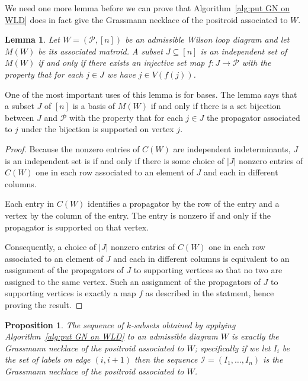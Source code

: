 \documentclass[11pt]{article}
\newcommand{\cP}{\mathcal{P}}
\newcommand{\II}{\mathcal{I}}
\newtheorem{lem}[thm]{Lemma}
\newtheorem{prop}[thm]{Proposition}
\theoremstyle{remark}
\theoremstyle{definition}
\begin{document}
We need one more lemma before we can prove that Algorithm~\ref{alg:put GN on WLD} does in fact give the Grassmann necklace of the positroid associated to $W$.

\begin{lem}\label{lem basis as perm}
Let $W = (\cP,[n])$ be an admissible Wilson loop diagram and let $M(W)$ be its associated matroid. A subset $J \subseteq [n]$ is an independent set of $M(W)$ if and only if there exists an injective set map $f : J \rightarrow \cP$ with the property that for each $j\in J$ we have $j \in V(f(j))$.
\end{lem}

One of the most important uses of this lemma is for bases.  The lemma says that a subset $J$ of $[n]$ is a basis of $M(W)$ if and only if there is a set bijection between $J$ and $\cP$ with the property that for each $j\in J$ the propagator associated to $j$ under the bijection is supported on vertex $j$.

\begin{proof}
  Because the nonzero entries of $C(W)$ are independent indeterminants,
  $J$ is an independent set is if and only if there is some choice of $|J|$ nonzero entries of $C(W)$ one in each row associated to an element of $J$ and each in different columns.

  Each entry in $C(W)$ identifies a propagator by the row of the entry and a vertex by the column of the entry.  The entry is nonzero if and only if the propagator is supported on that vertex.
  
  Consequently, a choice of $|J|$ nonzero entries of $C(W)$ one in each row associated to an element of $J$ and each in different columns is equivalent to an assignment of the propagators of $J$ to supporting vertices so that no two are assigned to the same vertex.  Such an assignment of the propagators of $J$ to supporting vertices is exactly a map $f$ as described in the statment, hence proving the result.
\end{proof}

\begin{prop}\label{res:alg gives GN}
The sequence of $k$-subsets obtained by applying Algorithm~\ref{alg:put GN on WLD} to an admissible diagram $W$ is exactly the Grassmann necklace of the positroid associated to $W$; specifically if we let  $I_i$ be the set of labels on edge $(i,i+1)$ then the sequence $\II = (I_1, \dots, I_n)$ is the Grassmann necklace of the positroid associated to $W$.
\end{prop}
\end{document}
